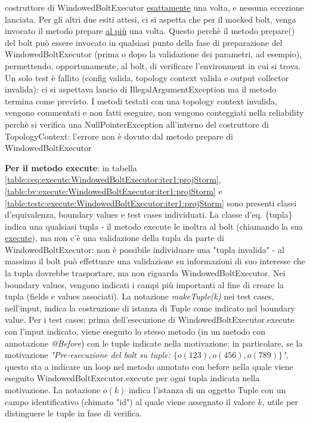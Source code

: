\documentclass[10pt, a4paper]{article}
\newcommand{\gettablelabel}[5]{table:#1:#2:#3:iter#4:proj#5}
\def\storm{Storm}
\newcommand{\ceq}[1]{\{#1\}}
\begin{document}
	{costruttore} 
	di WindowedBoltExecutor	\underline{esattamente} una volta, e nessuna eccezione lanciata. 
	Per gli altri due esiti attesi, ci si aspetta che per il mocked bolt, venga invocato il metodo prepare \underline{al più} una
	volta.
	Questo perchè il metodo prepare() del bolt può essere invocato in qualsiasi punto della fase di preparazione del
	WindowedBoltExecutor (prima o dopo la validazione dei parametri, ad esempio), permettendo, opportunamente, al bolt, di
	verificare l'environment in cui si trova.
	Un solo test è fallito (config valida, topology context valida e output collector invalida): ci si aspettava lancio di 
	IllegalArgumentException ma il metodo termina come previsto.
	I metodi testati con una topology context invalida, vengono commentati e non fatti eseguire, non vengono conteggiati nella
	reliability perchè si verifica una NullPointerException all'interno del costruttore di TopologyContext: l'errore non è dovuto
	dal metodo prepare di WindowedBoltExecutor
	
	\textbf{Per il metodo execute}: in tabella 
	\ref{\gettablelabel{ceq}{execute}{WindowedBoltExecutor}{1}{\storm}},
	\ref{\gettablelabel{bv}{execute}{WindowedBoltExecutor}{1}{\storm}} e 
	\ref{\gettablelabel{testc}{execute}{WindowedBoltExecutor}{1}{\storm}} sono presenti
	classi d'equivalenza, boundary values e test cases individuati. 
	La classe d'eq. \ceq{tupla} indica una qualsiasi tupla - il metodo execute le inoltra al bolt (chiamando la sua 
	\href{https://storm.apache.org/releases/2.6.2/javadocs/org/apache/storm/topology/IWindowedBolt.html#execute(org.apache.storm.windowing.TupleWindow)}
	{execute}),
	ma non c'è una validazione
	della tupla da parte di WindowedBoltExecutor: non è possibile individuare una "tupla invalida" - al massimo il bolt
	può effettuare una validazione su informazioni di suo interesse che la tupla dovrebbe trasportare, ma non riguarda
	WindowedBoltExecutor.
	Nei boundary values, vengono indicati i campi più importanti al fine di creare la tupla (fields e values associati).
	La notazione \textit{makeTuple(k)} nei test cases, nell'input, indica la costruzione di istanza di 
	Tuple come indicato nel boundary value.
	Per i test cases: prima dell'esecuzione di WindowedBoltExecutor.execute con l'input indicato, viene eseguito lo stesso
	metodo (in un metodo con annotazione \textit{@Before}) con le tuple indicate nella motivazione: in particolare, se la
	motivazione \textit{"Pre-esecuzione del bolt su tuple: $\{o(123),o(456),o(789)\}$"}, questo sta a indicare un loop nel metodo
	annotato con before nella quale viene eseguito WindowedBoltExecutor.execute per ogni tupla indicata nella motivazione.
	La notazione $o(k)$ indica l'istanza di un oggetto Tuple con un campo identificativo (chimato "id") al quale viene assegnato
	il valore $k$, utile per distinguere le tuple in fase di verifica.
	
\end{document}
